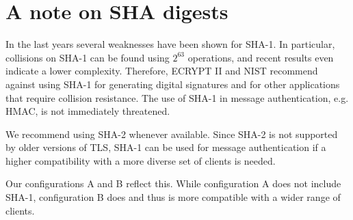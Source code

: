 \section{A note on SHA digests}
\label{section:SHA}


In the last years several weaknesses have been shown for SHA-1. In
particular, collisions on SHA-1 can be found using $2^{63}$ operations, and
recent results even indicate a lower complexity. Therefore,
ECRYPT II and NIST recommend against using SHA-1 for generating digital
signatures and for other applications that require collision resistance.
The use of SHA-1 in message authentication, e.g. HMAC, is not
immediately threatened.

We recommend using SHA-2 whenever available. Since SHA-2 is not
supported by older versions of TLS, SHA-1 can be used for message
authentication if a higher compatibility with a more diverse set of
clients is needed.


Our configurations A and B reflect this. While configuration A does not include
SHA-1, configuration B does and thus is more compatible with a wider range of
clients.
